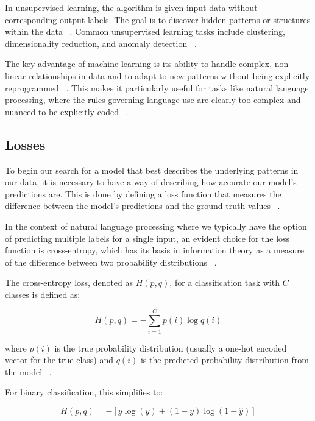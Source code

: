 \documentclass[a4paper, oneside]{discothesis}
\begin{document}
In unsupervised learning, the algorithm is given input data without corresponding output labels. The goal is to discover hidden patterns or structures within the data ~\cite{ghahramani2004unsupervised}. Common unsupervised learning tasks include clustering, dimensionality reduction, and anomaly detection ~\cite{hinton2006reducing}.

The key advantage of machine learning is its ability to handle complex, non-linear relationships in data and to adapt to new patterns without being explicitly reprogrammed ~\cite{goodfellow2016deep}. 
This makes it particularly useful for tasks like natural language processing, where the rules governing language use are clearly too complex and nuanced to be explicitly coded ~\cite{jurafsky2009speech}.

\subsection{Losses}
To begin our search for a model that best describes the underlying patterns in our data, it is necessary to have a way of describing how accurate our model's predictions are. This is done by defining a loss function that measures the difference between the model's predictions and the ground-truth values ~\cite{goodfellow2016deep}.

In the context of natural language processing where we typically have the option of predicting multiple labels for a single input, an evident choice for the loss function is cross-entropy, which has its basis in information theory as a measure of the difference between two probability distributions ~\cite{shannon1948mathematical}.

The cross-entropy loss, denoted as $H(p,q)$, for a classification task with $C$ classes is defined as:

\begin{equation}
    H(p,q) = -\sum_{i=1}^C p(i) \log q(i)
\end{equation}

where $p(i)$ is the true probability distribution (usually a one-hot encoded vector for the true class) and $q(i)$ is the predicted probability distribution from the model ~\cite{murphy2012machine}.

For binary classification, this simplifies to:

\begin{equation}
    H(p,q) = -[y \log(\hat{y}) + (1-y) \log(1-\hat{y})]
\end{equation}
\end{document}
